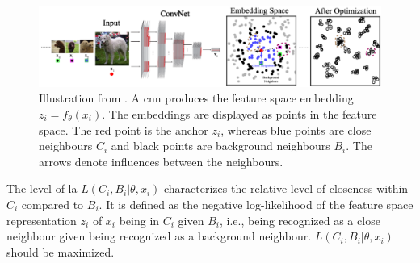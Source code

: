\begin{figure}[!htb] %
    \centering
    \includegraphics[width=360pt]{images/la_neighbourhoods.png}
    \caption{Illustration from \citet{local_aggr_2019}.
    A \ac{cnn} produces the feature space embedding $z_i = f_\theta(x_i)$.
    The embeddings are displayed as points in the feature space.
    The red point is the anchor $z_i$, 
    whereas blue points are close neighbours $C_i$ and
    black points are background neighbours $B_i$.
    The arrows denote influences between the neighbours.}
    \label{fig:la_bi_ci}
\end{figure}

The level of \ac{la} $L(C_i,B_i | \theta, x_i)$ 
characterizes the relative level of closeness within $C_i$ compared to $B_i$.
It is defined as the negative log-likelihood 
of the feature space representation $z_i$ of $x_i$ being in $C_i$ given $B_i$, 
i.e., being recognized as a close neighbour given being recognized as a background neighbour.
$L(C_i,B_i | \theta, x_i)$ should be maximized.